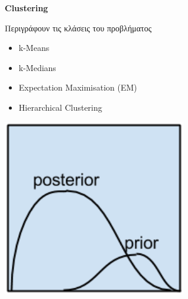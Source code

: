 \begin{minipage}{0.5\textwidth}

  \textbf{\large Clustering}

  Περιγράφουν τις κλάσεις του προβλήματος
  \begin{itemize}
    \setlength\itemsep{0em}
    \item{k-Means}
    \item{k-Medians}
    \item{Expectation Maximisation (EM)}
    \item{Hierarchical Clustering}
  \end{itemize}
\end{minipage}
\begin{minipage}{0.5\textwidth}
  \begin{center}
    \includegraphics[width=0.6\textwidth]{./images/chapter3/bayesian_algorithms.png}
  \end{center}
\end{minipage}

